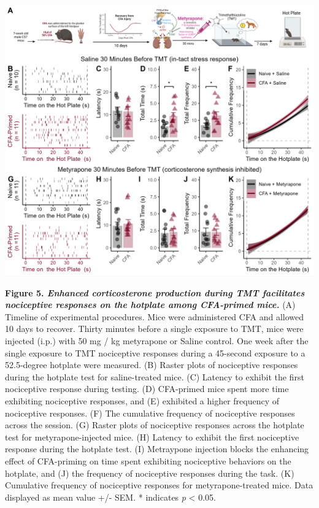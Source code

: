 \documentclass[
]{book}
\begin{document}
\includegraphics[width=33.33in]{Figs/5_HP_Mety}

\textbf{Figure 5. \emph{Enhanced corticosterone production during TMT facilitates nociceptive responses on the hotplate among CFA-primed mice.}} (A) Timeline of experimental procedures. Mice were administered CFA and allowed 10 days to recover. Thirty minutes before a single exposure to TMT, mice were injected (i.p.) with 50 mg / kg metyrapone or Saline control. One week after the single exposure to TMT nociceptive responses during a 45-second exposure to a 52.5-degree hotplate were measured. (B) Raster plots of nociceptive responses during the hotplate test for saline-treated mice. (C) Latency to exhibit the first nociceptive response during testing. (D) CFA-primed mice spent more time exhibiting nociceptive responses, and (E) exhibited a higher frequency of nociceptive responses. (F) The cumulative frequency of nociceptive responses across the session. (G) Raster plots of nociceptive responses across the hotplate test for metyrapone-injected mice. (H) Latency to exhibit the first nociceptive response during the hotplate test. (I) Metraypone injection blocks the enhancing effect of CFA-priming on time spent exhibiting nociceptive behaviors on the hotplate, and (J) the frequency of nociceptive responses during the task. (K) Cumulative frequency of nociceptive responses for metyrapone-treated mice. Data displayed as mean value +/- SEM. * indicates \emph{p} \textless{} 0.05.
\end{document}
